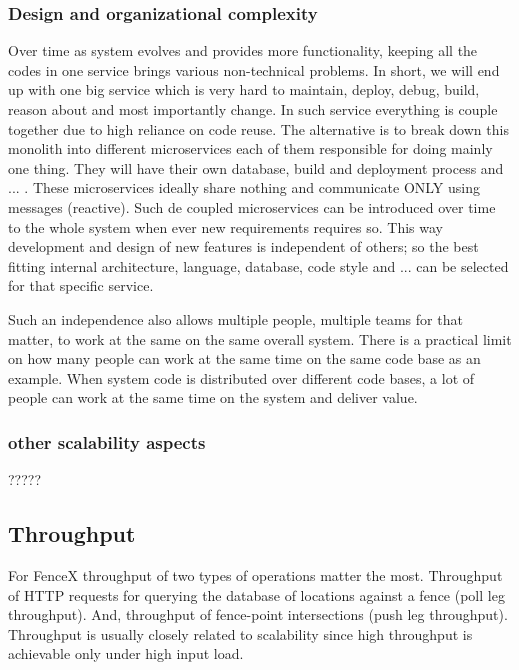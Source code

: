 \documentclass[a4]{report}
\begin{document}
    \subsubsection{Design and organizational complexity}
    Over time as system evolves and provides more functionality, keeping all the codes in one service brings various
    non-technical problems.
    In short, we will end up with one big service which is very hard to maintain, deploy, debug, build, reason about
    and most importantly change.
    In such service everything is couple together due to high reliance on code reuse.
    The alternative is to break down this monolith into different microservices each of them responsible for doing
    mainly one thing.
    They will have their own database, build and deployment process and ... .
    These microservices ideally share nothing and communicate ONLY using messages (reactive).
    Such de coupled microservices can be introduced over time to the whole system when ever new requirements requires so.
    This way development and design of new features is independent of others;
    so the best fitting internal architecture, language, database, code style and ... can be selected for that specific
    service.

    Such an independence also allows multiple people, multiple teams for that matter, to work at the same on the same
    overall system.
    There is a practical limit on how many people can work at the same time on the same code base as an example.
    When system code is distributed over different code bases, a lot of people can work at the same time on the
    system and deliver value.

    \subsubsection{other scalability aspects}
    ?????


    \subsection{Throughput}
    For FenceX throughput of two types of operations matter the most.
    Throughput of HTTP requests for querying the database of locations against a fence (poll leg throughput).
    And, throughput of fence-point intersections (push leg throughput).
    Throughput is usually closely related to scalability since high throughput is achievable only under high input
    load.
\end{document}
